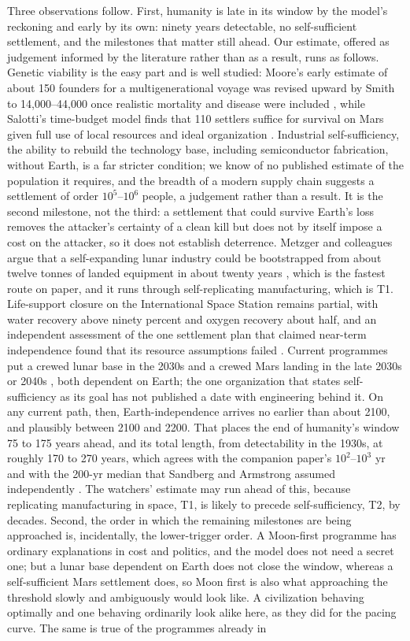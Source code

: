 \documentclass[preprint,12pt]{elsarticle}
\theoremstyle{definition}
\begin{document}
Three observations follow. First, humanity is late in its window by the model's reckoning and early by its own: ninety years detectable, no self-sufficient settlement, and the milestones that matter still ahead. Our estimate, offered as judgement informed by the literature rather than as a result, runs as follows. Genetic viability is the easy part and is well studied: Moore's early estimate of about 150 founders for a multigenerational voyage was revised upward by Smith to 14,000--44,000 once realistic mortality and disease were included \citep{Smith2014}, while Salotti's time-budget model finds that 110 settlers suffice for survival on Mars given full use of local resources and ideal organization \citep{Salotti2020}. Industrial self-sufficiency, the ability to rebuild the technology base, including semiconductor fabrication, without Earth, is a far stricter condition; we know of no published estimate of the population it requires, and the breadth of a modern supply chain suggests a settlement of order $10^{5}$--$10^{6}$ people, a judgement rather than a result. It is the second milestone, not the third: a settlement that could survive Earth's loss removes the attacker's certainty of a clean kill but does not by itself impose a cost on the attacker, so it does not establish deterrence. Metzger and colleagues argue that a self-expanding lunar industry could be bootstrapped from about twelve tonnes of landed equipment in about twenty years \citep{Metzger2013}, which is the fastest route on paper, and it runs through self-replicating manufacturing, which is T1. Life-support closure on the International Space Station remains partial, with water recovery above ninety percent and oxygen recovery about half, and an independent assessment of the one settlement plan that claimed near-term independence found that its resource assumptions failed \citep{Do2016}. Current programmes put a crewed lunar base in the 2030s and a crewed Mars landing in the late 2030s or 2040s \citep{NASA2024}, both dependent on Earth; the one organization that states self-sufficiency as its goal has not published a date with engineering behind it. On any current path, then, Earth-independence arrives no earlier than about 2100, and plausibly between 2100 and 2200. That places the end of humanity's window 75 to 175 years ahead, and its total length, from detectability in the 1930s, at roughly 170 to 270 years, which agrees with the companion paper's $10^{2}$--$10^{3}$ yr and with the 200-yr median that Sandberg and Armstrong assumed independently \citep{SandbergArmstrong2013}. The watchers' estimate may run ahead of this, because replicating manufacturing in space, T1, is likely to precede self-sufficiency, T2, by decades. Second, the order in which the remaining milestones are being approached is, incidentally, the lower-trigger order. A Moon-first programme has ordinary explanations in cost and politics, and the model does not need a secret one; but a lunar base dependent on Earth does not close the window, whereas a self-sufficient Mars settlement does, so Moon first is also what approaching the threshold slowly and ambiguously would look like. A civilization behaving optimally and one behaving ordinarily look alike here, as they did for the pacing curve. The same is true of the programmes already in 
\end{document}
